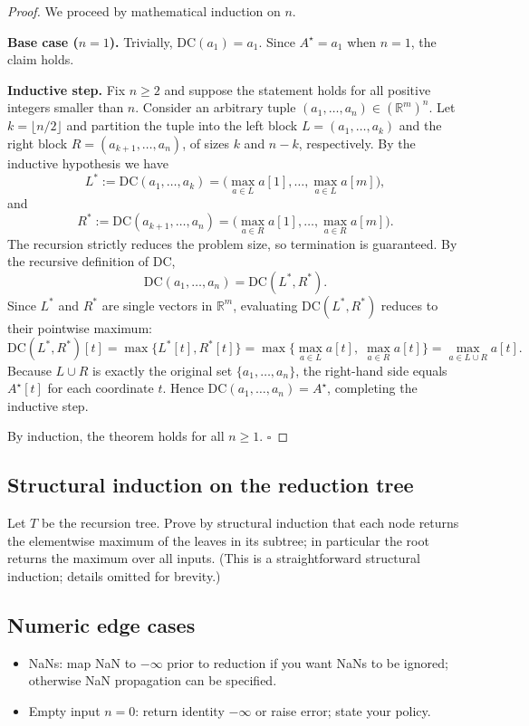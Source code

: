 \documentclass[11pt]{article}
\begin{document}
\begin{proof}
We proceed by mathematical induction on \(n\).

\textbf{Base case (\(n=1\)).} Trivially, \(\mathrm{DC}(a_1)=a_1\). Since \(A^\star=a_1\) when \(n=1\), the claim holds.

\textbf{Inductive step.} Fix \(n\ge 2\) and suppose the statement holds for all positive integers smaller than \(n\). Consider an arbitrary tuple \((a_1,\dots,a_n)\in(\mathbb{R}^m)^n\). Let \(k=\lfloor n/2\rfloor\) and partition the tuple into the left block \(L=(a_1,\dots,a_k)\) and the right block \(R=(a_{k+1},\dots,a_n)\), of sizes \(k\) and \(n-k\), respectively. By the inductive hypothesis we have
\[
L^\ast := \mathrm{DC}(a_1,\dots,a_k) = \big(\max_{a\in L} a[1],\dots,\max_{a\in L} a[m]\big),
\]
and
\[
R^\ast := \mathrm{DC}(a_{k+1},\dots,a_n) = \big(\max_{a\in R} a[1],\dots,\max_{a\in R} a[m]\big).
\]
The recursion strictly reduces the problem size, so termination is guaranteed. By the recursive definition of \(\mathrm{DC}\),
\[
\mathrm{DC}(a_1,\dots,a_n) = \mathrm{DC}(L^\ast, R^\ast).
\]
Since \(L^\ast\) and \(R^\ast\) are single vectors in \(\mathbb{R}^m\), evaluating \(\mathrm{DC}(L^\ast,R^\ast)\) reduces to their pointwise maximum:
\[
\mathrm{DC}(L^\ast,R^\ast)[t] = \max\{L^\ast[t],R^\ast[t]\}
= \max\!\big\{\max_{a\in L} a[t],\;\max_{a\in R} a[t]\big\}
= \max_{a\in L\cup R} a[t].
\]
Because \(L\cup R\) is exactly the original set \(\{a_1,\dots,a_n\}\), the right-hand side equals \(A^\star[t]\) for each coordinate \(t\). Hence \(\mathrm{DC}(a_1,\dots,a_n)=A^\star\), completing the inductive step.

By induction, the theorem holds for all \( n \ge 1 \). \(\square\)
\end{proof}


\subsection{Structural induction on the reduction tree}
Let \(T\) be the recursion tree. Prove by structural induction that each node returns the elementwise maximum of the leaves in its subtree; in particular the root returns the maximum over all inputs. (This is a straightforward structural induction; details omitted for brevity.)

\subsection{Numeric edge cases}
\begin{itemize}
  \item NaNs: map NaN to \(-\infty\) prior to reduction if you want NaNs to be ignored; otherwise NaN propagation can be specified.
  \item Empty input \(n=0\): return identity \(\mathbf{-\infty}\) or raise error; state your policy.
\end{itemize}
\end{document}
